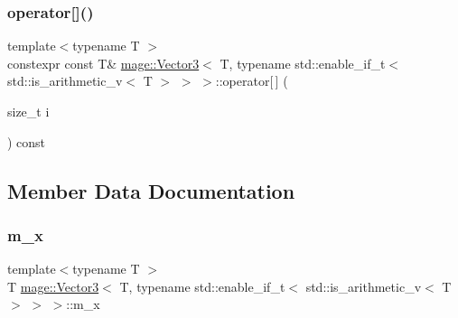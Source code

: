 \subsubsection{\texorpdfstring{operator[]()}{operator[]()}\hspace{0.1cm}{\footnotesize\ttfamily [2/2]}}
{\footnotesize\ttfamily template$<$typename T $>$ \\
constexpr const T\& \hyperlink{structmage_1_1_vector3}{mage\+::\+Vector3}$<$ T, typename std\+::enable\+\_\+if\+\_\+t$<$ std\+::is\+\_\+arithmetic\+\_\+v$<$ T $>$ $>$ $>$\+::operator\mbox{[}$\,$\mbox{]} (\begin{DoxyParamCaption}\item[{size\+\_\+t}]{i }\end{DoxyParamCaption}) const\hspace{0.3cm}{\ttfamily [noexcept]}}



\subsection{Member Data Documentation}
\hypertarget{structmage_1_1_vector3_3_01_t_00_01typename_01std_1_1enable__if__t_3_01std_1_1is__arithmetic__v_3_01_t_01_4_01_4_01_4_a9ddf49f594152925040379efa6fc0895}{}\label{structmage_1_1_vector3_3_01_t_00_01typename_01std_1_1enable__if__t_3_01std_1_1is__arithmetic__v_3_01_t_01_4_01_4_01_4_a9ddf49f594152925040379efa6fc0895} 
\subsubsection{\texorpdfstring{m\+\_\+x}{m\_x}}
{\footnotesize\ttfamily template$<$typename T $>$ \\
T \hyperlink{structmage_1_1_vector3}{mage\+::\+Vector3}$<$ T, typename std\+::enable\+\_\+if\+\_\+t$<$ std\+::is\+\_\+arithmetic\+\_\+v$<$ T $>$ $>$ $>$\+::m\+\_\+x}

\hypertarget{structmage_1_1_vector3_3_01_t_00_01typename_01std_1_1enable__if__t_3_01std_1_1is__arithmetic__v_3_01_t_01_4_01_4_01_4_ab0078c33aaef4855156b3ea0a456a84c}{}\label{structmage_1_1_vector3_3_01_t_00_01typename_01std_1_1enable__if__t_3_01std_1_1is__arithmetic__v_3_01_t_01_4_01_4_01_4_ab0078c33aaef4855156b3ea0a456a84c} 
